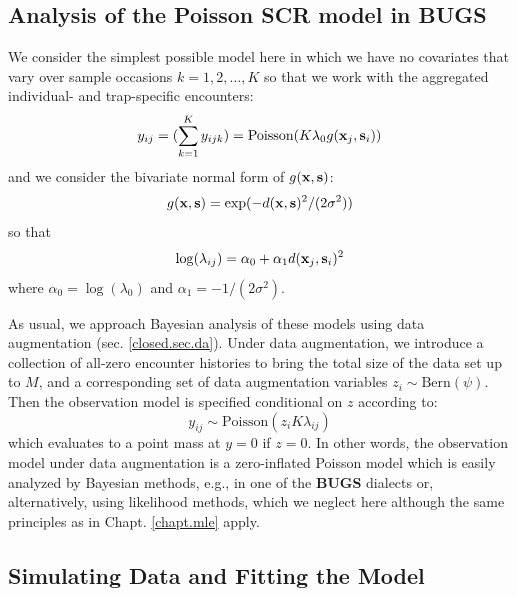 \subsection{Analysis of the Poisson SCR model in BUGS}

We consider the simplest possible model here in which we have no
covariates that vary over sample occasions  $k=1,2,\ldots,K$ 
so that we work with
the aggregated individual- and trap-specific encounters:
\[
y_{ij} = (\sum_{k=1}^{K} y_{ijk}) =  \mbox{Poisson}(K  \lambda_{0} 
g({\bf x}_{j},{\bf s}_{i}) )
\]
and we consider the bivariate normal form of $g({\bf x},{\bf s})$:
\[
g({\bf x},{\bf s}) = \exp( -d({\bf x}, {\bf
  s})^{2} /(2\sigma^{2}))
\]
so that 
\[
\log( \lambda_{ij})  =\alpha_{0} + \alpha_{1} d({\bf x}_{j}, {\bf s}_{i})^2
\]
where $\alpha_{0} = \log(\lambda_{0})$ and $\alpha_1 = -1/(2\sigma^2)$.


As usual, we approach Bayesian analysis of these
models using data augmentation (sec. \ref{closed.sec.da}).
Under data augmentation, we introduce a collection of all-zero encounter
histories to bring the total size of the data set up to $M$, and a corresponding
set of data augmentation variables $z_{i} \sim \mbox{Bern}(\psi)$. Then
the observation model is specified conditional on $z$ according to:
\[
y_{ij} \sim  \mbox{Poisson}(z_{i} K  \lambda_{ij})
\]
which evaluates to a point mass at $y=0$ if $z=0$.  In other words, the
observation model under data augmentation is a zero-inflated Poisson
model which is easily analyzed by Bayesian methods, e.g., in one of
the {\bf BUGS}
dialects or, alternatively,  using likelihood methods, which we neglect here although
the same principles as in Chapt. \ref{chapt.mle} apply.


\subsection{Simulating Data and Fitting the Model}


